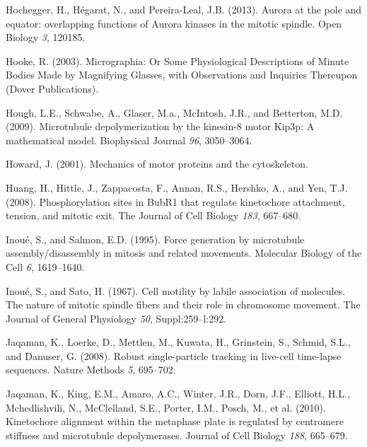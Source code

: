 \documentclass[12pt,a4paper,twoside,openright]{book}
\begin{document}
Hochegger, H., Hégarat, N., and Pereira-Leal, J.B. (2013). Aurora at the
pole and equator: overlapping functions of Aurora kinases in the mitotic
spindle. Open Biology \emph{3}, 120185.

Hooke, R. (2003). Micrographia: Or Some Physiological Descriptions of
Minute Bodies Made by Magnifying Glasses, with Observations and
Inquiries Thereupon (Dover Publications).

Hough, L.E., Schwabe, A., Glaser, M.a., McIntosh, J.R., and Betterton,
M.D. (2009). Microtubule depolymerization by the kinesin-8 motor Kip3p:
A mathematical model. Biophysical Journal \emph{96}, 3050--3064.

Howard, J. (2001). Mechanics of motor proteins and the cytoskeleton.

Huang, H., Hittle, J., Zappacosta, F., Annan, R.S., Hershko, A., and
Yen, T.J. (2008). Phosphorylation sites in BubR1 that regulate
kinetochore attachment, tension, and mitotic exit. The Journal of Cell
Biology \emph{183}, 667--680.

Inoué, S., and Salmon, E.D. (1995). Force generation by microtubule
assembly/disassembly in mitosis and related movements. Molecular Biology
of the Cell \emph{6}, 1619--1640.

Inoué, S., and Sato, H. (1967). Cell motility by labile association of
molecules. The nature of mitotic spindle fibers and their role in
chromosome movement. The Journal of General Physiology \emph{50},
Suppl:259--l:292.

Jaqaman, K., Loerke, D., Mettlen, M., Kuwata, H., Grinstein, S., Schmid,
S.L., and Danuser, G. (2008). Robust single-particle tracking in
live-cell time-lapse sequences. Nature Methods \emph{5}, 695--702.

Jaqaman, K., King, E.M., Amaro, A.C., Winter, J.R., Dorn, J.F., Elliott,
H.L., Mchedlishvili, N., McClelland, S.E., Porter, I.M., Posch, M., et
al. (2010). Kinetochore alignment within the metaphase plate is
regulated by centromere stiffness and microtubule depolymerases. Journal
of Cell Biology \emph{188}, 665--679.
\end{document}
